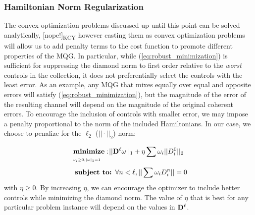 \documentclass[aps,nofootinbib,pra,notitlepage,twocolumn]{revtex4-1}
\newcommand{\kcy}[1]{{\color{red}[#1]\textsubscript{\rm{KCY}}}}
\begin{document}


\subsubsection{Hamiltonian Norm Regularization}
\label{sec:norm}
The convex optimization problems discussed up until this point can be solved analytically, \kcy{nope!} however casting them as convex optimization problems will allow us to add penalty terms to the cost function to promote different properties of the MQG. In particular, while (\ref{eq:robust_minimization}) is sufficient for suppressing the diamond norm to first order relative to the \textit{worst} controls in the collection, it does not preferentially select the controls with the least error. As an example, any MQG that mixes equally over equal and opposite errors will satisfy (\ref{eq:robust_minimization}), but the magnitude of the error of the resulting channel will depend on the magnitude of the original coherent errors. To encourage the inclusion of controls with smaller error, we may impose a penalty proportional to the norm of the included Hamiltonians. In our case, we choose to penalize for the $\ell_2$ ($||\cdot||_2$) norm:

\newcommand{\bunderbrace}[2]{%
  \begin{array}[t]{@{}c@{}}
  #1\\
  \parbox{\widthof{#1}}{$\scriptscriptstyle#2$}
  \end{array}
}

\begin{equation}\label{eq:minimization_l2}
\begin{split}
& \ \bunderbrace{\textbf{minimize}: }{\omega_i\geq0, |\omega|_1=1} ||{\bold{D}^{\ell}}\omega||_1+ \eta\sum\omega_i||D^0_i||_2\\
&\ \ \textbf{subject to: } \forall n<\ell, ||\sum \omega_iD_i^n||=0\\
\end{split}
\end{equation}
with $\eta \geq 0$. By increasing $\eta$, we can encourage the optimizer to include better controls while minimizing the diamond norm. The value of $\eta$ that is best for any particular problem instance will depend on the values in $\bold{D}^\ell$.
\end{document}
